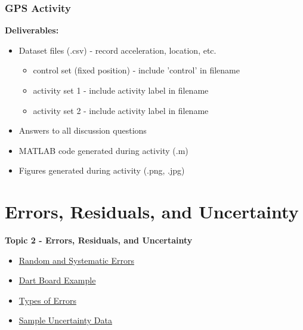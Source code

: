 \documentclass[fleqn]{beamer} %
\newcommand{\sectionIItitle}{Errors, Residuals, and Uncertainty}
\newcommand{\sectionIsubsectionIVtitle}{GPS Activity}
\newcommand{\sectionIIsubsectionItitle}{Random and Systematic Errors}
\newcommand{\sectionIIsubsectionIItitle}{Dart Board Example}
\newcommand{\sectionIIsubsectionIIItitle}{Types of Errors}
\newcommand{\sectionIIsubsectionIVtitle}{Sample Uncertainty Data}
\begin{document}
			\begin{frame}
				\frametitle{\sectionIsubsectionIVtitle}
				\textbf{Deliverables:}
				\begin{itemize}
					\item Dataset files (.csv) - record acceleration, location, etc.
					\begin{itemize}
						\item control set (fixed position) - include 'control' in filename
						\item activity set 1 - include activity label in filename
						\item activity set 2 - include activity label in filename
					\end{itemize}
					\item Answers to all discussion questions
					\item MATLAB code generated during activity (.m)
					\item Figures generated during activity (.png, .jpg)
				\end{itemize}
				
			\end{frame}


	\section{\sectionIItitle}\label{sectionII}

		\begin{frame}
			\large \textbf{Topic 2 - \sectionIItitle} \vspace{3mm}\\

			\begin{itemize}
				\item \hyperlink{sectionIIsubsectionI}{\sectionIIsubsectionItitle} \vspc %
				\item \hyperlink{sectionIIsubsectionII}{\sectionIIsubsectionIItitle} \vspc %
				\item \hyperlink{sectionIIsubsectionIII}{\sectionIIsubsectionIIItitle} \vspc %
				\item \hyperlink{sectionIIsubsectionIV}{\sectionIIsubsectionIVtitle} \vspc %
			\end{itemize}

		\end{frame}

\end{document}
